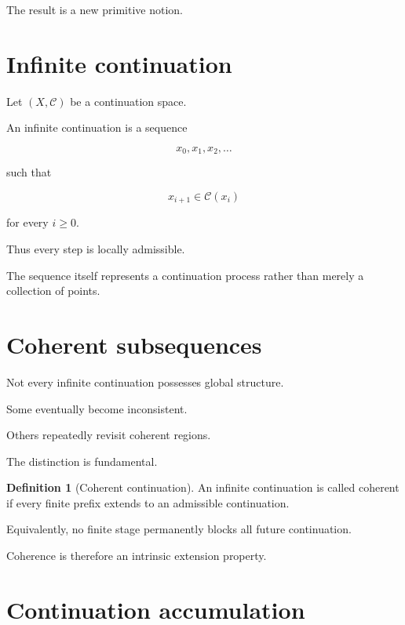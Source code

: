 \documentclass[13pt,openany]{book}
\theoremstyle{plain}
\theoremstyle{definition}
\newtheorem{definition}{Definition}[chapter]
\begin{document}
The result is a new primitive notion.

\section{Infinite continuation}

Let $(X,\mathcal C)$ be a continuation space.

An infinite continuation is a sequence

\[
x_0,x_1,x_2,\ldots
\]

such that

\[
x_{i+1}\in\mathcal C(x_i)
\]

for every $i\ge0$.

Thus every step is locally admissible.

The sequence itself represents a continuation process rather than merely a
collection of points.

\section{Coherent subsequences}

Not every infinite continuation possesses global structure.

Some eventually become inconsistent.

Others repeatedly revisit coherent regions.

The distinction is fundamental.

\begin{definition}[Coherent continuation]
An infinite continuation is called coherent if every finite prefix extends to an
admissible continuation.
\end{definition}

Equivalently, no finite stage permanently blocks all future continuation.

Coherence is therefore an intrinsic extension property.

\section{Continuation accumulation}
\end{document}
